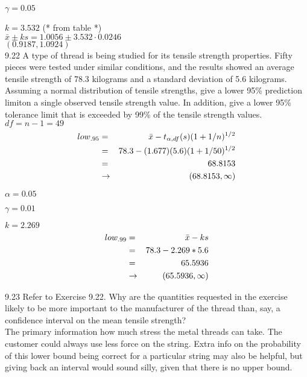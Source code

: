 $\gamma = 0.05 $

$k = 3.532$ (* from table *) \\



$\bar{x} \pm k s = 1.0056 \pm 3.532 \cdot 0.0246$ \\

$(0.9187,1.0924)$ \\


9.22  A type of thread is being studied for its tensile strength properties. Fifty pieces were tested under similar conditions, and the results showed an average tensile strength of 78.3 kilograms and a standard deviation of 5.6 kilograms. Assuming a normal distribution of tensile strengths, give a lower 95\% prediction limiton a single observed tensile strength value. In addition, give a lower 95\% tolerance limit that is exceeded by 99\% of the tensile strength values. \\

$df = n - 1 = 49$ \\

\begin{eqnarray*}
low_{.95} & = & \bar{x} - t_{\alpha,df}(s) (1 + 1/n)^{1/2}  \\
          & = & 78.3 - (1.677)(5.6)(1+1/50)^{1/2}  \\
          & = & 68.8153 \\
          & \rightarrow & (68.8153, \infty)
\end{eqnarray*}


$\alpha = 0.05$

$\gamma = 0.01$

$k = 2.269$ \\

\begin{eqnarray*}
low_{.99} & =&  \bar{x} - ks \\
          & = & 78.3 - 2.269 * 5.6 \\
          & = & 65.5936 \\
          & \rightarrow & (65.5936, \infty)
\end{eqnarray*}

9.23 Refer to Exercise 9.22. Why are the quantities requested in the exercise likely to be more important to the manufacturer of the thread than, say, a confidence interval on the mean tensile strength? \\

The primary information how much stress the metal threads can take. The customer could always use less force on the string. Extra info on the probability of this lower bound being correct for a particular string may also be helpful, but giving back an interval would sound silly, given that there is no upper bound.


